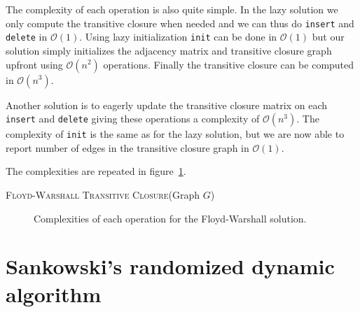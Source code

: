 \documentclass[a4paper,oneside,article,11pt]{memoir}
\begin{document}
The complexity of each operation is also quite simple. In the lazy solution we only compute the transitive closure when needed and we can thus do \texttt{insert} and \texttt{delete} in $\mathcal{O}(1)$. Using lazy initialization \texttt{init} can be done in $\mathcal{O}(1)$ but our solution simply initializes the adjacency matrix and transitive closure graph upfront using $\mathcal{O}(n^2)$ operations. Finally the transitive closure can be computed in $\mathcal{O}(n^3)$.

Another solution is to eagerly update the transitive closure matrix on each \texttt{insert} and \texttt{delete} giving these operations a complexity of $\mathcal{O}(n^3)$. The complexity of \texttt{init} is the same as for the lazy solution, but we are now able to report number of edges in the transitive closure graph in $\mathcal{O}(1)$.

The complexities are repeated in figure~\ref{fig:fw-comp}.

\begin{algorithm}[h]
\caption{\textsc{Floyd-Warshall Transitive Closure}(Graph $G$)}
\label{alg:fw}
\begin{algorithmic}[1]
		\ENDFOR
	\ENDFOR
\ENDFOR
\end{algorithmic}
\end{algorithm}

\begin{figure}[h]
\caption{Complexities of each operation for the Floyd-Warshall solution.}
\label{fig:fw-comp}
\end{figure}

\chapter{Sankowski's randomized dynamic algorithm}
\label{chap:sankowski}
\end{document}
